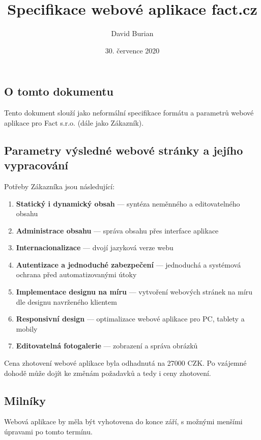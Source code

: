 \documentclass[12pt, a4paper, notitlepage]{article}
\title{\vspace{-3cm}Specifikace webové aplikace fact.cz}
\author{David Burian}
\date{30. července 2020}
\begin{document}
\maketitle
\subsection*{O tomto dokumentu}

Tento dokument slouží jako neformální specifikace formátu a parametrů webové
aplikace pro Fact s.r.o. (dále jako Zákazník).

\subsection*{Parametry výsledné webové stránky a jejího vypracování}

Potřeby Zákazníka jsou následující:

\begin{enumerate}
\item \textbf{Statický i dynamický obsah} --- syntéza neměnného a editovatelného
obsahu
\item \textbf{Administrace obsahu} --- správa obsahu přes interface aplikace
\item \textbf{Internacionalizace} --- dvojí jazyková verze webu
\item \textbf{Autentizace a jednoduché zabezpečení} --- jednoduchá a systémová
ochrana před automatizovanými útoky
\item \textbf{Implementace designu na míru} --- vytvoření webových stránek na
míru dle designu navrženého klientem
\item \textbf{Responsivní design} --- optimalizace webové aplikace pro PC,
tablety a mobily
\item \textbf{Editovatelná fotogalerie} --- zobrazení a správa obrázků
\end{enumerate}

Cena zhotovení webové aplikace byla odhadnutá na 27000 CZK\@. Po vzájemné dohodě
může dojít ke změnám požadavků a tedy i ceny zhotovení.

\subsection*{Milníky}

Webová aplikace by měla být vyhotovena do konce září, s možnými menšími úpravami
po tomto termínu.
\end{document}
